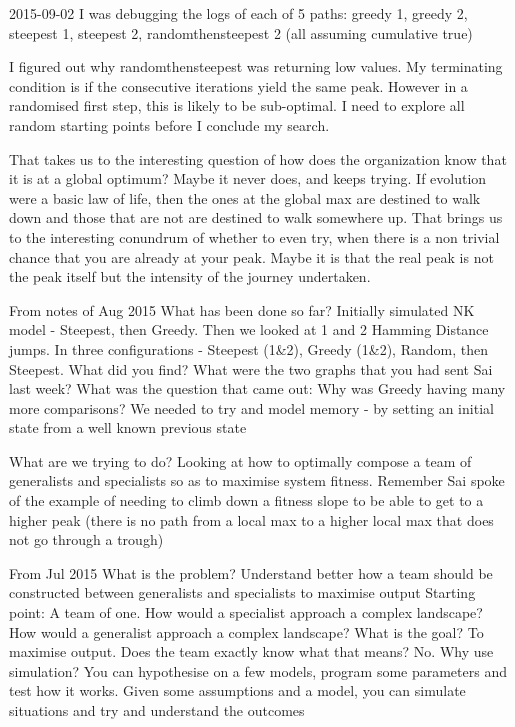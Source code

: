 \documentclass[12pt]{article}
\begin{document}
2015-09-02
I was debugging the logs of each of 5 paths: greedy 1, greedy 2, steepest 1, steepest 2, randomthensteepest 2 (all assuming cumulative true)

I figured out why randomthensteepest was returning low values. My terminating condition is if the consecutive iterations yield the same peak. However in a randomised first step, this is likely to be sub-optimal. I need to explore all random starting points before I conclude my search.

That takes us to the interesting question of how does the organization know that it is at a global optimum? Maybe it never does, and keeps trying. If evolution were a basic law of life, then the ones at the global max are destined to walk down and those that are not are destined to walk somewhere up. That brings us to the interesting conundrum of whether to even try, when there is a non trivial chance that you are already at your peak. Maybe it is that the real peak is not the peak itself but the intensity of the journey undertaken.

From notes of Aug 2015
What has been done so far?
Initially simulated NK model - Steepest, then Greedy. Then we looked at 1 and 2 Hamming Distance jumps. In three configurations - Steepest (1\&2), Greedy (1\&2), Random, then Steepest. What did you find? What were the two graphs that you had sent Sai last week?
What was the question that came out: Why was Greedy having many more comparisons?
We needed to try and model memory - by setting an initial state from a well known previous state

What are we trying to do?
Looking at how to optimally compose a team of generalists and specialists so as to maximise system fitness. Remember Sai spoke of the example of needing to climb down a fitness slope to be able to get to a higher peak (there is no path from a local max to a higher local max that does not go through a trough)


From Jul 2015
What is the problem? Understand better how a team should be constructed between generalists and specialists to maximise output
Starting point: A team of one. How would a specialist approach a complex landscape? How would a generalist approach a complex landscape? What is the goal? To maximise output. Does the team exactly know what that means? No. Why use simulation? You can hypothesise on a few models, program some parameters and test how it works. Given some assumptions and a model, you can simulate situations and try and understand the outcomes
\end{document}
